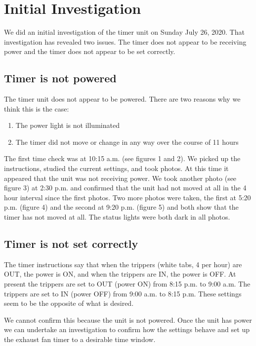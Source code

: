 \documentclass[letterpaper,12pt]{texMemo}
\begin{document}
\section{Initial Investigation}

We did an initial investigation of the timer unit on Sunday July 26, 2020.
That investigation has revealed two issues. The timer does not appear
to be receiving power and the timer does not appear to be set correctly.

\subsection{Timer is not powered}

The timer unit does not appear to be powered. There are two reasons
why we think this is the case:

\begin{enumerate}
\item The power light is not illuminated
\item The timer did not move or change in any way over the course of 11 hours
\end{enumerate}

The first time check was at 10:15 a.m. (see figures 1 and 2). We picked up the
instructions, studied the current settings, and took photos. At this time it
appeared that the unit was not receiving power. We took another photo
(see figure 3) at 2:30 p.m. and confirmed that the unit had not moved at
all in the 4 hour interval since the first photos. Two more photos were taken,
the first at 5:20 p.m. (figure 4) and the second at 9:20 p.m. (figure 5) and
both show that the timer has not moved at all. The status lights were both
dark in all photos.

\subsection{Timer is not set correctly}

The timer instructions say that when the trippers (white tabs, 4 per hour)
are OUT, the power is ON, and
when the trippers are IN, the power is OFF. At present the trippers are set
to OUT (power ON) from 8:15 p.m. to 9:00 a.m. The
trippers are set to IN (power OFF) from 9:00 a.m. to 8:15 p.m.
These settings seem to be the opposite of what is desired.

We cannot confirm this because the unit is not powered. Once the unit has
power we can undertake an investigation to confirm how the settings behave
and set up the exhaust fan timer to a desirable time window.
\end{document}
